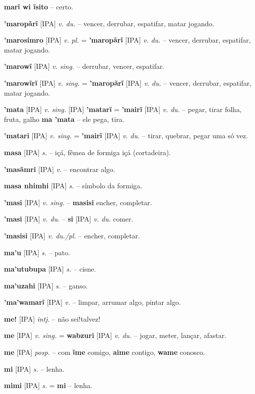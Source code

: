 \textbf{marĩ wi ĩsito} -- certo.

\textbf{'maropãrĩ} [IPA] \textit{v. du.} -- vencer, derrubar, espatifar, matar jogando.

\textbf{'marosimro} [IPA] \textit{v. pl.} = \textbf{'maropãrĩ} [IPA] \textit{v. du.} -- vencer, derrubar, espatifar, matar jogando.

\textbf{'marowĩ} [IPA] \textit{v. sing.} -- derrubar, vencer, espatifar.

\textbf{'marowĩrĩ} [IPA] \textit{v. sing.} = \textbf{'maropãrĩ} [IPA] \textit{v. du.} -- vencer, derrubar, espatifar, matar jogando.

\textbf{'mata} [IPA] \textit{v. sing.} [IPA] \textbf{'matarĩ} = \textbf{'mairĩ} [IPA] \textit{v. du.} -- pegar, tirar folha, fruta, galho  \textbf{ma 'mata} -- ele pega, tira.

\textbf{'matari} [IPA] \textit{v. sing.} = \textbf{'mairĩ} [IPA] \textit{v. du.} -- tirar, quebrar, pegar uma só vez.

\textbf{masa} [IPA] \textit{s.} -- içá, fêmea de formiga içá (cortadeira).

\textbf{'masãmri} [IPA] \textit{v.} -- encontrar algo.

\textbf{masa nhimhi} [IPA] \textit{s.} -- símbolo da formiga.

\textbf{'masi} [IPA] \textit{v. sing.} -- \textbf{masisi} encher, completar.

\textbf{'masi} [IPA] \textit{v. du.} -- \textbf{si} [IPA] \textit{v. du.} comer.

\textbf{'masisi} [IPA] \textit{v. du./pl.} -- encher, completar.

\textbf{ma'u} [IPA] \textit{s.} -- pato.

\textbf{ma'utubupa} [IPA] \textit{s.} -- cisne.

\textbf{ma'uzahi} [IPA] \textit{s.} -- ganso.

\textbf{'ma'wamarĩ} [IPA] \textit{v.} -- limpar, arrumar algo, pintar algo.

\textbf{me!} [IPA] \textit{intj.} -- não sei!talvez!

\textbf{me} [IPA] \textit{v. sing.} = \textbf{wabzuri} [IPA] \textit{v. du.} -- jogar, meter, lançar, afastar.

\textbf{me} [IPA] \textit{posp.} -- com  \textbf{ĩme} comigo, \textbf{aime} contigo, \textbf{wame} conosco.

\textbf{mi} [IPA] \textit{s.} -- lenha.

\textbf{mimi} [IPA] \textit{s.} = \textbf{mi} -- lenha.

